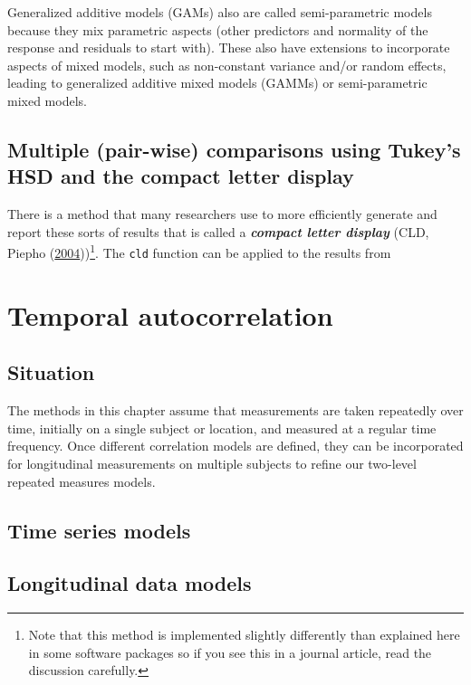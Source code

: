 \documentclass[
]{book}
\begin{document}
Generalized additive models (GAMs) also are called semi-parametric models because they mix parametric aspects (other predictors and normality of the response and residuals to start with). These also have extensions to incorporate aspects of mixed models, such as non-constant variance and/or random effects, leading to generalized additive mixed models (GAMMs) or semi-parametric mixed models.

\hypertarget{section9-2}{%
\section{Multiple (pair-wise) comparisons using Tukey's HSD and the compact letter display}\label{section9-2}}

\indent There is a method that many researchers use to more efficiently generate and
report these sorts of results that is called a \textbf{\emph{compact letter display}} 
(CLD, Piepho (\protect\hyperlink{ref-Piepho2004}{2004}))\footnote{Note that this method is implemented slightly differently than explained here in some software packages so if you see this in a journal article, read the discussion carefully.}. The \texttt{cld} function can be applied to the results from

\hypertarget{chapter10}{%
\chapter{Temporal autocorrelation}\label{chapter10}}

\hypertarget{section10-1}{%
\section{Situation}\label{section10-1}}

The methods in this chapter assume that measurements are taken repeatedly over time, initially on a single subject or location, and measured at a regular time frequency. Once different correlation models are defined, they can be incorporated for longitudinal measurements on multiple subjects to refine our two-level repeated measures models.

\hypertarget{section10-2}{%
\section{Time series models}\label{section10-2}}

\hypertarget{section10-3}{%
\section{Longitudinal data models}\label{section10-3}}
\end{document}
